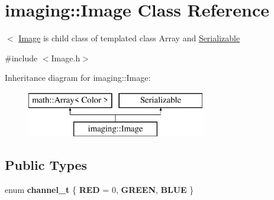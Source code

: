 \hypertarget{classimaging_1_1_image}{}\section{imaging\+:\+:Image Class Reference}
\label{classimaging_1_1_image}


$<$ \hyperlink{classimaging_1_1_image}{Image} is child class of templated class Array and \hyperlink{class_serializable}{Serializable}  




{\ttfamily \#include $<$Image.\+h$>$}

Inheritance diagram for imaging\+:\+:Image\+:\begin{figure}[H]
\begin{center}
\leavevmode
\includegraphics[height=2.000000cm]{classimaging_1_1_image}
\end{center}
\end{figure}
\subsection*{Public Types}
\begin{DoxyCompactItemize}
\item 
\mbox{\label{classimaging_1_1_image_a477c2fbe962468df24ce83b11a54e79a}} 
enum {\bfseries channel\+\_\+t} \{ {\bfseries R\+ED} = 0, 
{\bfseries G\+R\+E\+EN}, 
{\bfseries B\+L\+UE}
 \}
\end{DoxyCompactItemize}
